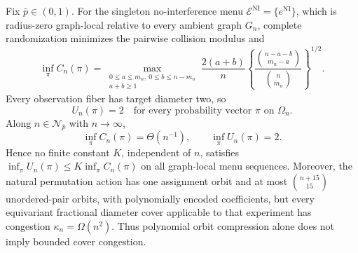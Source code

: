 Fix \(\bar p\in(0,1)\). For the singleton no-interference menu \(\mathcal E^{\mathrm{NI}}=\{e^{\mathrm{NI}}\}\), which is radius-zero graph-local relative to every ambient graph \(G_n\), complete randomization minimizes the pairwise collision modulus and
\[
 \inf_\pi C_n(\pi)
 =
 \max_{\substack{0\le a\le m_n,\ 0\le b\le n-m_n\\a+b\ge1}}
 \frac{2(a+b)}{n}
 \left\{
 \frac{\binom{n-a-b}{m_n-a}}{\binom n{m_n}}
 \right\}^{1/2}. \tag{1}
\]
Every observation fiber has target diameter two, so
\[
 U_n(\pi)=2\quad\text{for every probability vector \(\pi\) on \(\Omega_n\)}. \tag{2}
\]
Along \(n\in\mathcal N_{\bar p}\) with \(n\to\infty\),
\[
 \inf_\pi C_n(\pi)=\Theta(n^{-1}),
 \qquad
 \inf_\pi U_n(\pi)=2. \tag{3}
\]
Hence no finite constant \(K\), independent of \(n\), satisfies \(\inf_\pi U_n(\pi)\le K\inf_\pi C_n(\pi)\) on all graph-local menu sequences. Moreover, the natural permutation action has one assignment orbit and at most \(\binom{n+15}{15}\) unordered-pair orbits, with polynomially encoded coefficients, but every equivariant fractional diameter cover applicable to that experiment has congestion \(\kappa_n=\Omega(n^2)\). Thus polynomial orbit compression alone does not imply bounded cover congestion.